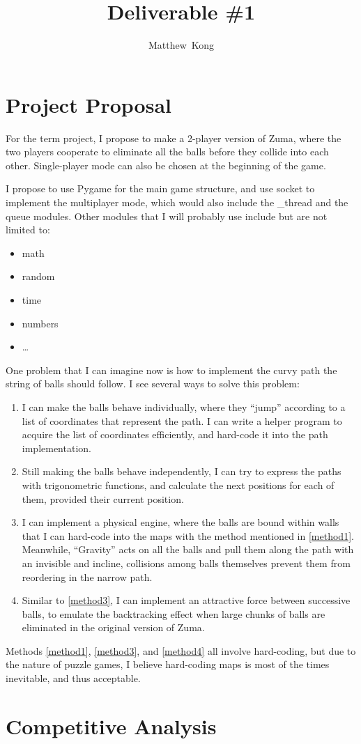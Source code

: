 \documentclass[letterpaper,titlepage]{article}
\author{Matthew~Kong}
\title{Deliverable \#1}
\begin{document}
\maketitle
\tableofcontents
\clearpage
\section{Project Proposal}
For the term project, I propose to make a 2-player version of Zuma, where the two players cooperate to eliminate all the balls before they collide into each other. Single-player mode can also be chosen at the beginning of the game.

I propose to use Pygame for the main game structure, and use socket to implement the multiplayer mode, which would also include the \_thread and the queue modules. Other modules that I will probably use include but are not limited to:
\begin{itemize}
\item math
\item random
\item time
\item numbers
\item \ldots
\end{itemize}

One problem that I can imagine now is how to implement the curvy path the string of balls should follow. I see several ways to solve this problem:
\begin{enumerate}
\item\label{method1}I can make the balls behave individually, where they ``jump'' according to a list of coordinates that represent the path. I can write a helper program to acquire the list of coordinates efficiently, and hard-code it into the path implementation.
\item Still making the balls behave independently, I can try to express the paths with trigonometric functions, and calculate the next positions for each of them, provided their current position.
\item\label{method3}I can implement a physical engine, where the balls are bound within walls that I can hard-code into the maps with the method mentioned in \ref{method1}. Meanwhile, ``Gravity'' acts on all the balls and pull them along the path with an invisible and incline, collisions among balls themselves prevent them from reordering in the narrow path.
\item\label{method4}Similar to \ref{method3}, I can implement an attractive force between successive balls, to emulate the backtracking effect when large chunks of balls are eliminated in the original version of Zuma.
\end{enumerate}

Methods \ref{method1}, \ref{method3}, and \ref{method4} all involve hard-coding, but due to the nature of puzzle games, I believe hard-coding maps is most of the times inevitable, and thus acceptable.
\section{Competitive Analysis}
\end{document}
